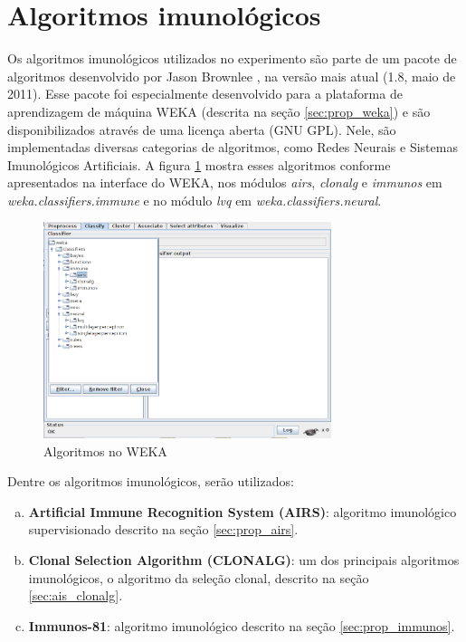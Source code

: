 \section{Algoritmos imunológicos}

Os algoritmos imunológicos utilizados no experimento são parte de um pacote de algoritmos desenvolvido por Jason Brownlee \cite{Brownlee2011}, na versão mais atual (1.8, maio de 2011). Esse pacote foi especialmente desenvolvido para a plataforma de aprendizagem de máquina WEKA (descrita na seção \ref{sec:prop_weka}) e são disponibilizados através de uma licença aberta (GNU GPL). Nele, são implementadas diversas categorias de algoritmos, como Redes Neurais e Sistemas Imunológicos Artificiais. A figura \ref{fig:prop_wekaais} mostra esses algoritmos conforme apresentados na interface do WEKA, nos módulos \emph{airs}, \emph{clonalg} e \emph{immunos} em \emph{weka.classifiers.immune} e no módulo \emph{lvq} em \emph{weka.classifiers.neural}.

\begin{figure}[h]
    \vspace{0.5cm}
    \centering
    \caption{Algoritmos no WEKA}
    \label{fig:prop_wekaais}
    \vspace{0.5cm}
    \includegraphics[width=0.75\textwidth]{img/weka_ais.png}
    \vspace{0.5cm}
\end{figure}

Dentre os algoritmos imunológicos, serão utilizados:

\begin{enumerate}[a)]
    \item \textbf{Artificial Immune Recognition System (AIRS)}: algoritmo imunológico supervisionado descrito na seção \ref{sec:prop_airs}.
    \item \textbf{Clonal Selection Algorithm (CLONALG)}: um dos principais algoritmos imunológicos, o algoritmo da seleção clonal, descrito na seção \ref{sec:ais_clonalg}.
    \item \textbf{Immunos-81}: algoritmo imunológico descrito na seção \ref{sec:prop_immunos}.

\end{enumerate}

